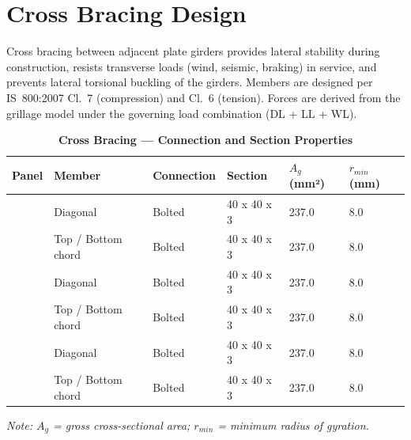 \section{Cross Bracing Design}
\label{sec:cross-bracing}

Cross bracing between adjacent plate girders provides lateral stability during construction, resists transverse loads (wind, seismic, braking) in service, and prevents lateral torsional buckling of the girders. Members are designed per IS~800:2007 Cl.~7 (compression) and Cl.~6 (tension). Forces are derived from the grillage model under the governing load combination  (DL + LL + WL).

\vspace{1em}

\vspace{0.4em}
\noindent
\setlength{\tabcolsep}{4pt}
\setlength\LTleft{0pt}
\setlength\LTright{\fill}

\begin{longtable}{|C{2.0cm}|L{2.0cm}|L{2.2cm}|C{2.5cm}|C{2.0cm}|C{2.0cm}|}
\caption{\textbf{Cross Bracing --- Connection and Section Properties}}
\hline
\textbf{Panel} & \textbf{Member} & \textbf{Connection} & \textbf{Section} & \textbf{$A_g$ (mm²)} & \textbf{$r_{min}$ (mm)} \\[6pt]
\hline
{} & Diagonal & Bolted & 40 x 40 x 3 & 237.0 & 8.0 \\[6pt]
 & Top / Bottom chord & Bolted & 40 x 40 x 3 & 237.0 & 8.0 \\[6pt]
\hline
{} & Diagonal & Bolted & 40 x 40 x 3 & 237.0 & 8.0 \\[6pt]
 & Top / Bottom chord & Bolted & 40 x 40 x 3 & 237.0 & 8.0 \\[6pt]
\hline
{} & Diagonal & Bolted & 40 x 40 x 3 & 237.0 & 8.0 \\[6pt]
 & Top / Bottom chord & Bolted & 40 x 40 x 3 & 237.0 & 8.0 \\[6pt]
\hline
\end{longtable}
\noindent\textit{Note: $A_g$ = gross cross-sectional area; $r_{min}$ = minimum radius of gyration.}

